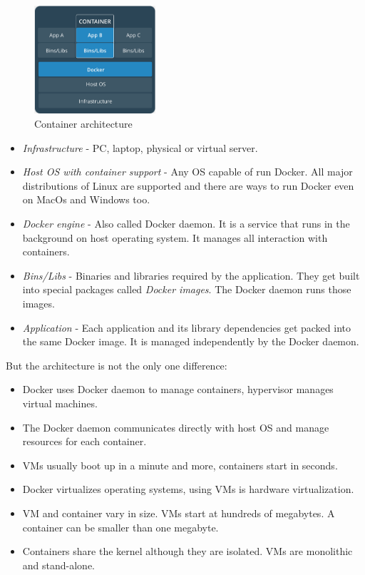 \documentclass{gifce}
\begin{document}
\begin{figure}[h!]
\centering
\includegraphics[width=0.4\textwidth]{img/Docker_container.png}
\caption{Container architecture}
\label{fig:Docker_container}
\end{figure}

\begin{itemize}
\item \textit{Infrastructure} - PC, laptop, physical or virtual server.
\item \textit{Host OS with container support} - Any OS capable of run Docker. All major distributions of Linux are supported and there are ways
to run Docker even on MacOs and Windows too.
\item \textit{Docker engine} - Also called Docker daemon. It is a service that runs in the background on host operating system. It manages all interaction with containers.
\item \textit{Bins/Libs} - Binaries and libraries required by the application. They get built into special packages called \textit{Docker images}.
The Docker daemon runs those images.
\item \textit{Application} - Each application and its library dependencies get packed into the same Docker image. It is managed independently by the Docker daemon. 
\end{itemize}

\noindent
But the architecture is not the only one difference:
\begin{itemize}
\item Docker uses Docker daemon to manage containers, hypervisor manages virtual machines.
\item The Docker daemon communicates directly with host OS and manage resources for each container.
\item VMs usually boot up in a minute and more, containers start in seconds.
\item Docker virtualizes operating systems, using VMs is hardware virtualization.
\item VM and container vary in size. VMs start at hundreds of megabytes. A container can be smaller than one megabyte.
\item Containers share the kernel although they are isolated. VMs are monolithic and stand-alone.
\end{itemize}
\end{document}
